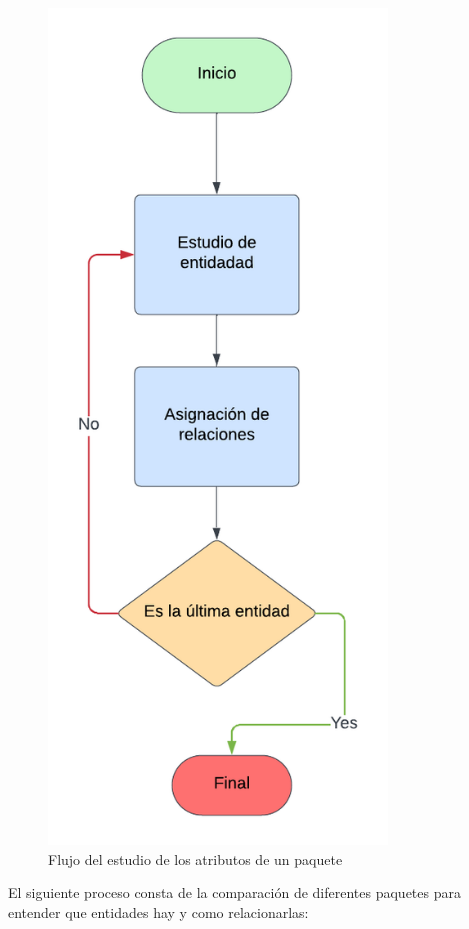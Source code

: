 \documentclass[a4paper, 12pt]{book}
\begin{document}
\begin{figure}
	\centering
	\includegraphics[width=9cm, keepaspectratio]{img/Estudio Atributos.png}
	\caption{Flujo del estudio de los atributos de un paquete}
	\label{fig:flujo_paquete}
\end{figure}

El siguiente proceso consta de la comparación de diferentes paquetes para entender que entidades hay y como relacionarlas:
\end{document}
